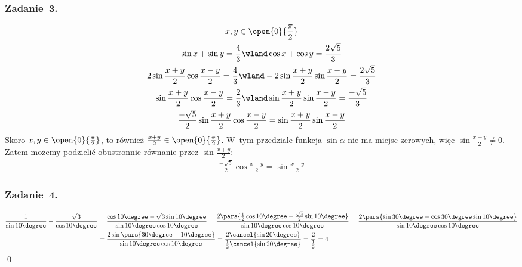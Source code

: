 \subsubsection*{Zadanie~3.}
\begin{gather*}
    x, y \in \open{0}{\frac{\pi}{2}}\\
    \sin x + \sin y = \frac{4}{3} \wland \cos x + \cos y = \frac{2\sqrt{5}}{3}\\
    2\sin\frac{x + y}{2}\cos\frac{x - y}{2} = \frac{4}{3} \wland -2\sin\frac{x + y}{2}\sin\frac{x - y}{2} = \frac{2\sqrt{5}}{3}\\
    \sin\frac{x + y}{2}\cos\frac{x - y}{2} = \frac{2}{3} \wland \sin\frac{x + y}{2}\sin\frac{x - y}{2} = \frac{-\sqrt{5}}{3}\\
    \frac{-\sqrt{5}}{2}\sin\frac{x + y}{2}\cos\frac{x - y}{2} = \sin\frac{x + y}{2}\sin\frac{x - y}{2}
\end{gather*}
Skoro \(x, y \in \open{0}{\frac{\pi}{2}}\), to również \(\frac{x + y}{2} \in \open{0}{\frac{\pi}{2}}\). W~tym przedziale funkcja \(\sin\alpha\) nie ma miejsc zerowych, więc \(\sin\frac{x + y}{2} \neq 0\). Zatem możemy podzielić obustronnie równanie przez \(\sin\frac{x + y}{2}\):
\begin{gather*}
    \frac{-\sqrt{5}}{2}\cos\frac{x - y}{2} = \sin\frac{x - y}{2}
\end{gather*}
\subsubsection*{Zadanie~4.}
\begin{gather*}
    \begin{split}
        \frac{1}{\sin10\degree} - \frac{\sqrt{3}}{\cos10\degree}
            &= \frac{\cos10\degree - \sqrt{3}\sin10\degree}{\sin10\degree\cos10\degree}
            = \frac{2\pars{\frac{1}{2}\cos10\degree - \frac{\sqrt{3}}{2}\sin10\degree}}{\sin10\degree\cos10\degree}
            = \frac{2\pars{\sin30\degree - \cos30\degree\sin10\degree}}{\sin10\degree\cos10\degree}\\
            &= \frac{2\sin\pars{30\degree - 10\degree}}{\sin10\degree\cos10\degree}
            = \frac{2\cancel{\sin20\degree}}{\frac{1}{2}\cancel{\sin20\degree}}
            = \frac{2}{\frac{1}{2}}
            = 4
    \end{split}
\end{gather*}
\qed
